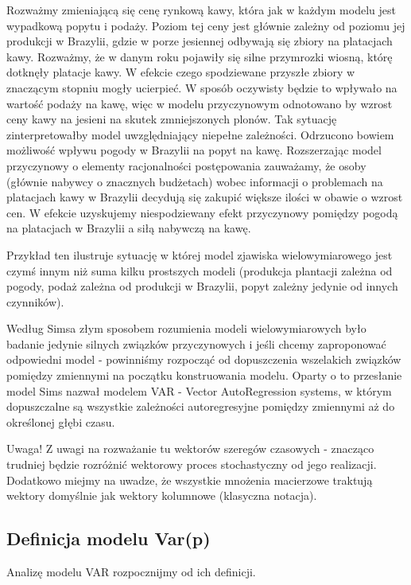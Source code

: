\documentclass[10pt,a4paper]{book}
\begin{document}
\begin{example}
Rozważmy zmieniającą się cenę rynkową kawy, która jak w każdym modelu jest wypadkową popytu i podaży. Poziom tej ceny jest głównie zależny od poziomu jej produkcji w Brazylii, gdzie w porze jesiennej odbywają się zbiory na platacjach kawy. Rozważmy, że w danym roku pojawiły się silne przymrozki wiosną, którę dotknęły platacje kawy. W efekcie czego spodziewane przyszłe zbiory w znaczącym stopniu mogły ucierpieć. W sposób oczywisty będzie to wpływało na wartość podaży na kawę, więc w modelu przyczynowym odnotowano by wzrost ceny kawy na jesieni na skutek zmniejszonych plonów. Tak sytuację zinterpretowałby model uwzględniający niepełne zależności. Odrzucono bowiem możliwość wpływu pogody w Brazylii na popyt na kawę. Rozszerzając model przyczynowy o elementy racjonalności postępowania zauważamy, że osoby (głównie nabywcy o znacznych budżetach) wobec informacji o problemach na platacjach kawy w Brazylii decydują się zakupić większe ilości w obawie o wzrost cen. W efekcie uzyskujemy niespodziewany efekt przyczynowy pomiędzy pogodą na platacjach w Brazylii a siłą nabywczą na kawę. 
\end{example} 
Przykład ten ilustruje sytuację w której model zjawiska wielowymiarowego jest czymś innym niż suma kilku prostszych modeli (produkcja plantacji zależna od pogody, podaż zależna od produkcji w Brazylii, popyt zależny jedynie od innych czynników).

Według Simsa złym sposobem rozumienia modeli wielowymiarowych było badanie jedynie silnych związków przyczynowych i jeśli chcemy zaproponować odpowiedni model - powinniśmy rozpocząć od dopuszczenia wszelakich związków pomiędzy zmiennymi na początku konstruowania modelu. Oparty o to przesłanie model Sims nazwał modelem VAR - Vector AutoRegression systems, w którym dopuszczalne są wszystkie zależności autoregresyjne pomiędzy zmiennymi aż do określonej głębi czasu.

Uwaga! Z uwagi na rozważanie tu wektorów szeregów czasowych - znacząco trudniej będzie rozróżnić wektorowy proces stochastyczny od jego realizacji. Dodatkowo miejmy na uwadze, że wszystkie mnożenia macierzowe traktują wektory domyślnie jak wektory kolumnowe (klasyczna notacja).



\subsection{Definicja modelu Var(p)}

Analizę modelu VAR rozpocznijmy od ich definicji.
\end{document}
